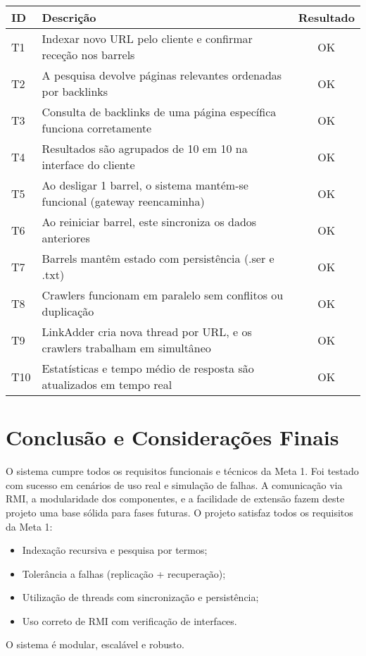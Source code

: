 \documentclass{article}
\begin{document}
\begin{tabularx}{\textwidth}{|l|X|c|}
\hline
\textbf{ID} & \textbf{Descrição} & \textbf{Resultado} \\
\hline
T1 & Indexar novo URL pelo cliente e confirmar receção nos barrels & OK \\
T2 & A pesquisa devolve páginas relevantes ordenadas por backlinks & OK \\
T3 & Consulta de backlinks de uma página específica funciona corretamente & OK \\
T4 & Resultados são agrupados de 10 em 10 na interface do cliente & OK \\
T5 & Ao desligar 1 barrel, o sistema mantém-se funcional (gateway reencaminha) & OK \\
T6 & Ao reiniciar barrel, este sincroniza os dados anteriores & OK \\
T7 & Barrels mantêm estado com persistência (.ser e .txt) & OK \\
T8 & Crawlers funcionam em paralelo sem conflitos ou duplicação & OK \\
T9 & LinkAdder cria nova thread por URL, e os crawlers trabalham em simultâneo & OK \\
T10 & Estatísticas e tempo médio de resposta são atualizados em tempo real & OK \\
\hline
\end{tabularx}











\newpage
\section{Conclusão e Considerações Finais}
O sistema cumpre todos os requisitos funcionais e técnicos da Meta 1. Foi testado com sucesso em cenários de uso real e simulação de falhas. A comunicação via RMI, a modularidade dos componentes, e a facilidade de extensão fazem deste projeto uma base sólida para fases futuras.
O projeto satisfaz todos os requisitos da Meta 1:
\begin{itemize}
    \item Indexação recursiva e pesquisa por termos;
    \item Tolerância a falhas (replicação + recuperação);
    \item Utilização de threads com sincronização e persistência;
    \item Uso correto de RMI com verificação de interfaces.
\end{itemize}

O sistema é modular, escalável e robusto.
\end{document}
